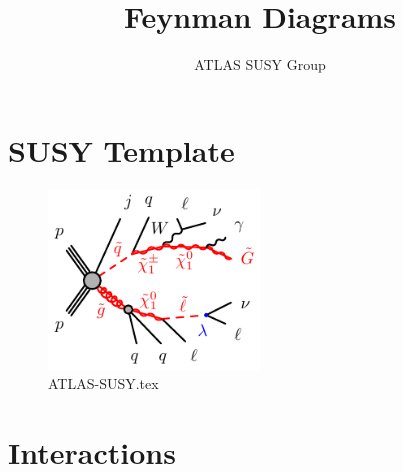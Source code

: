 \documentclass{article}
\begin{document}
\title{Feynman Diagrams}
\author{ATLAS SUSY Group}
\maketitle
\tableofcontents

\section*{SUSY Template}

\begin{figure}[!ht]
\centering
\includegraphics[width=0.5\textwidth]{ATLAS-SUSY.pdf}
\caption{ATLAS-SUSY.tex}
\end{figure}

\clearpage
\section{Interactions}
\end{document}

